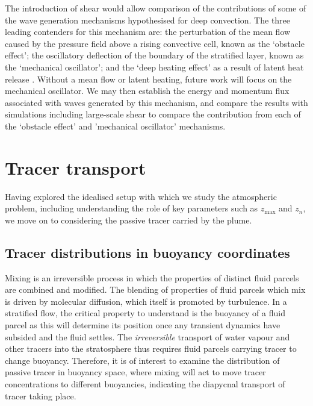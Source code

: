 \documentclass[a4paper]{article}
\begin{document}
The introduction of shear would allow comparison of the contributions of some of the 
wave generation mechanisms hypothesised for deep convection. The three leading contenders for this 
mechanism are: the perturbation of the mean flow caused by the pressure field above a rising convective cell,
known as the `obstacle effect'; the oscillatory deflection of the boundary of the stratified layer, known as
the `mechanical oscillator'; and the `deep heating effect' as a result of latent heat release
\citep{flynn2004}. Without a mean flow or latent heating, future work will focus on the mechanical oscillator.
We may then establish the energy and momentum flux associated with waves generated by this mechanism, and
compare the results with simulations including large-scale shear to compare the contribution from each of the
`obstacle effect' and 'mechanical oscillator' mechanisms.


\section{Tracer transport}
\label{sec:tracertransport}
Having explored the idealised setup with which we study the atmospheric problem, including understanding the
role of key parameters such as $z_{\max}$ and $z_n$, we move on to considering the passive tracer carried by
the plume. 

\subsection{Tracer distributions in buoyancy coordinates}
\label{sec:distributions}

Mixing is an irreversible process in which the properties of distinct fluid parcels are combined and modified.
The blending of properties of fluid parcels which mix is driven by molecular diffusion, which itself
is promoted by turbulence. In a stratified flow, the critical property to understand is the buoyancy of a
fluid parcel as this will determine its position once any transient dynamics have subsided and the fluid
settles. The \emph{irreversible} transport of water vapour and other tracers into the stratosphere thus
requires fluid parcels carrying tracer to change buoyancy. Therefore, it is of interest to examine the
distribution of passive tracer in buoyancy space, where mixing will act to move tracer concentrations to
different buoyancies, indicating the diapycnal transport of tracer taking place. 
\end{document}
